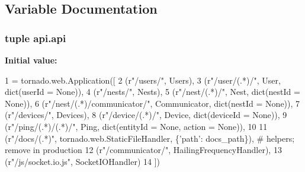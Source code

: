\subsection{Variable Documentation}
\hypertarget{namespaceapi_a5697ea202319f894facccacf78d93e89}{
\subsubsection[{api}]{\setlength{\rightskip}{0pt plus 5cm}tuple api.\-api}}\label{namespaceapi_a5697ea202319f894facccacf78d93e89}
{\bfseries Initial value\-:}
\begin{DoxyCode}
1 = tornado.web.Application([
2     (\textcolor{stringliteral}{r"/users/"}, Users),
3     (\textcolor{stringliteral}{r"/user/(.*)/"}, User, dict(userId = \textcolor{keywordtype}{None})),
4     (\textcolor{stringliteral}{r"/nests/"}, Nests),
5     (\textcolor{stringliteral}{r"/nest/(.*)/"}, Nest, dict(nestId = \textcolor{keywordtype}{None})),
6     (\textcolor{stringliteral}{r"/nest/(.*)/communicator/"}, Communicator, dict(nestId = \textcolor{keywordtype}{None})),
7     (\textcolor{stringliteral}{r"/devices/"}, Devices),
8     (\textcolor{stringliteral}{r"/device/(.*)/"}, Device, dict(deviceId = \textcolor{keywordtype}{None})),
9     (\textcolor{stringliteral}{r"/ping/(.*)/(.*)/"}, Ping, dict(entityId = \textcolor{keywordtype}{None}, action = \textcolor{keywordtype}{None})),
10     
11     (\textcolor{stringliteral}{r"/docs/(.*)"}, tornado.web.StaticFileHandler, \{\textcolor{stringliteral}{'path'}: docs\_path\}),    \textcolor{comment}{# helpers; remove in production}
12     (\textcolor{stringliteral}{r"/communicator/"}, HailingFrequencyHandler),
13     (\textcolor{stringliteral}{r"/js/socket.io.js"}, SocketIOHandler)
14 ])
\end{DoxyCode}
